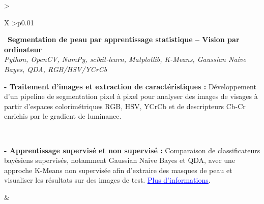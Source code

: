 \documentclass[letterpaper,8pt]{extarticle}
\newcommand{\indentbox}[2][1em]{\hspace*{#1}\parbox{\dimexpr\linewidth-#1\relax}{#2}}
\begin{document}
\begin{tabularx}{\textwidth}{>{\raggedright\arraybackslash}X >{\raggedleft\arraybackslash}p{0.01\textwidth}}
    \begin{minipage}[t]{\linewidth}\raggedright
      \textbullet\ \textbf{Segmentation de peau par apprentissage statistique -- Vision par ordinateur}\\
      \textit{\footnotesize Python, OpenCV, NumPy, scikit-learn, Matplotlib, K-Means, Gaussian Naive Bayes, QDA, RGB/HSV/YCrCb}\\
      \indentbox{\footnotesize \textbf{- Traitement d'images et extraction de caractéristiques : } Développement d'un pipeline de segmentation pixel à pixel pour analyser des images de visages à partir d'espaces colorimétriques RGB, HSV, YCrCb et de descripteurs Cb-Cr enrichis par le gradient de luminance.}\\
      \indentbox{\footnotesize \textbf{- Apprentissage supervisé et non supervisé : } Comparaison de classificateurs bayésiens supervisés, notamment Gaussian Naive Bayes et QDA, avec une approche K-Means non supervisée afin d'extraire des masques de peau et visualiser les résultats sur des images de test. 
      \href{https://github.com/JavierTarazona06/Vision_LocalFeatures_BayesianClassification_KMeans/blob/main/docs/rappport/rap.pdf}{\textcolor{blue}{\underline{Plus d'informations}}}.}
    \end{minipage}
    &
    \begin{minipage}[t]{\linewidth}\raggedleft %
    \end{minipage}\\


\end{tabularx}
\end{document}
